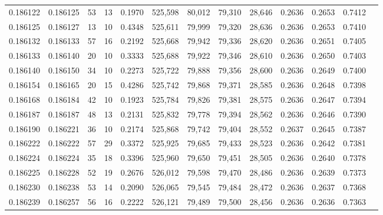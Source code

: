 \begin{tabular}{rrrrrrrrrrrrr}
0.186122 & 0.186125 &    53 &  13 &                                     0.1970 & 525,598 &  80,012 &  79,310 &  28,646 & 0.2636 & 0.2653 & 0.7412 \\
0.186125 & 0.186127 &    13 &  10 &                                     0.4348 & 525,611 &  79,999 &  79,320 &  28,636 & 0.2636 & 0.2653 & 0.7410 \\
0.186132 & 0.186133 &    57 &  16 &                                     0.2192 & 525,668 &  79,942 &  79,336 &  28,620 & 0.2636 & 0.2651 & 0.7405 \\
0.186133 & 0.186140 &    20 &  10 &                                     0.3333 & 525,688 &  79,922 &  79,346 &  28,610 & 0.2636 & 0.2650 & 0.7403 \\
0.186140 & 0.186150 &    34 &  10 &                                     0.2273 & 525,722 &  79,888 &  79,356 &  28,600 & 0.2636 & 0.2649 & 0.7400 \\
0.186154 & 0.186165 &    20 &  15 &                                     0.4286 & 525,742 &  79,868 &  79,371 &  28,585 & 0.2636 & 0.2648 & 0.7398 \\
0.186168 & 0.186184 &    42 &  10 &                                     0.1923 & 525,784 &  79,826 &  79,381 &  28,575 & 0.2636 & 0.2647 & 0.7394 \\
0.186187 & 0.186187 &    48 &  13 &                                     0.2131 & 525,832 &  79,778 &  79,394 &  28,562 & 0.2636 & 0.2646 & 0.7390 \\
0.186190 & 0.186221 &    36 &  10 &                                     0.2174 & 525,868 &  79,742 &  79,404 &  28,552 & 0.2637 & 0.2645 & 0.7387 \\
0.186222 & 0.186222 &    57 &  29 &                                     0.3372 & 525,925 &  79,685 &  79,433 &  28,523 & 0.2636 & 0.2642 & 0.7381 \\
0.186224 & 0.186224 &    35 &  18 &                                     0.3396 & 525,960 &  79,650 &  79,451 &  28,505 & 0.2636 & 0.2640 & 0.7378 \\
0.186225 & 0.186228 &    52 &  19 &                                     0.2676 & 526,012 &  79,598 &  79,470 &  28,486 & 0.2636 & 0.2639 & 0.7373 \\
0.186230 & 0.186238 &    53 &  14 &                                     0.2090 & 526,065 &  79,545 &  79,484 &  28,472 & 0.2636 & 0.2637 & 0.7368 \\
0.186239 & 0.186257 &    56 &  16 &                                     0.2222 & 526,121 &  79,489 &  79,500 &  28,456 & 0.2636 & 0.2636 & 0.7363 \\

\end{tabular}
